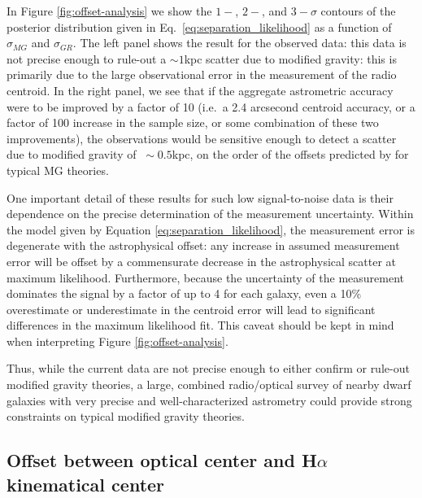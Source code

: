 \documentclass[twocolappendix, numberedappendix]{emulateapj}
\newcommand{\ha}{H$\alpha$}
\begin{document}
In Figure \ref{fig:offset-analysis} we show the $1-$, $2-$, and $3-\sigma$
contours
of the posterior distribution given in Eq.~\ref{eq:separation_likelihood}
as a function of $\sigma_{MG}$ and $\sigma_{GR}$.  The left panel shows the
result for the observed data: this data is
not precise enough to rule-out a $\sim 1$kpc scatter due to modified
gravity: this is primarily due to the large observational error in the
measurement of the radio centroid.  In the right panel, we see that
if the aggregate astrometric accuracy were to be improved by a factor of 10
(i.e.\ a 2.4 arcsecond centroid accuracy, 
or a factor of 100 increase in the sample size, or some combination of these
two improvements),
the observations would be sensitive enough to detect a scatter due to
modified gravity of $~\sim 0.5$kpc, on the order of the offsets
predicted by \citep{bhuvjake2011} for typical MG theories.

One important detail of these results for such low signal-to-noise data
is their dependence on
the precise determination of the measurement uncertainty.  Within the model
given by Equation \ref{eq:separation_likelihood}, the measurement error is
degenerate with the astrophysical offset: any increase in assumed measurement
error will be offset by a commensurate decrease in the astrophysical scatter
at maximum likelihood.  Furthermore, because the uncertainty of the measurement
dominates the signal by a factor of up to 4 for each galaxy, even a 10\%
overestimate or underestimate in the centroid error will lead to significant
differences in the maximum likelihood fit.  This caveat should be kept in
mind when interpreting Figure \ref{fig:offset-analysis}.

Thus, while the current data are not precise enough to either confirm or
rule-out modified gravity theories, a large, combined radio/optical survey of
nearby dwarf galaxies with very precise and well-characterized astrometry
could provide strong constraints on typical modified gravity theories.


\subsection{Offset between optical center and \ha{} kinematical center}
\label{sec:kinematical}
\end{document}
